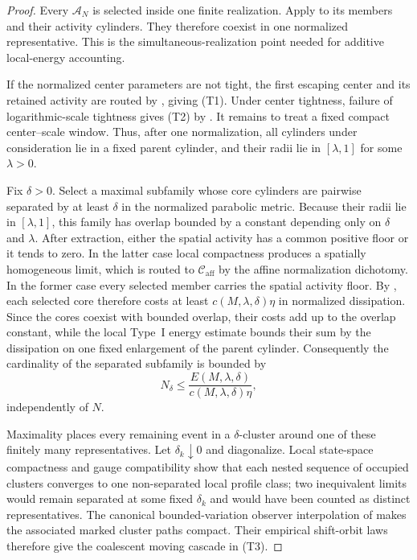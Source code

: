 \documentclass[11pt]{amsart}
\numberwithin{equation}{section}
\theoremstyle{plain}
\theoremstyle{definition}
\theoremstyle{remark}
\newcommand{\Caff}{\mathcal C_{\mathrm{aff}}}
\begin{document}
\begin{proof}
Every \(\mathcal A_N\) is selected inside one finite realization.  Apply
 to its members and their
activity cylinders.  They therefore coexist in one normalized representative.
This is the simultaneous-realization point needed for additive local-energy
accounting.

If the normalized center parameters are not tight, the first escaping center
and its retained activity are routed by
,
giving \textup{(T1)}.  Under center tightness, failure of logarithmic-scale
tightness gives \textup{(T2)} by
.
It remains to treat a fixed compact center--scale window.  Thus, after one
normalization, all cylinders under consideration lie in a fixed parent
cylinder, and their radii lie in \([\lambda,1]\) for some \(\lambda>0\).

Fix \(\delta>0\).  Select a maximal subfamily whose core cylinders are
pairwise separated by at least \(\delta\) in the normalized parabolic metric.
Because their radii lie in \([\lambda,1]\), this family has overlap bounded by
a constant depending only on \(\delta\) and \(\lambda\).  After extraction,
either the spatial activity has a common positive floor or it tends to zero.
In the latter case local compactness produces a spatially homogeneous limit,
which is routed to \(\Caff\) by the affine normalization dichotomy.  In the
former case every selected member carries the spatial activity floor.  By
, each selected core therefore costs
at least \(c(M,\lambda,\delta)\eta\) in normalized dissipation.  Since the
cores coexist with bounded overlap, their costs add up to the overlap
constant, while the local Type~I energy estimate
 bounds their sum by the
dissipation on one fixed enlargement of the parent cylinder.  Consequently
the cardinality of the separated subfamily is bounded by
\[
 N_{\delta}
 \le
 \frac{E(M,\lambda,\delta)}{c(M,\lambda,\delta)\eta},
\]
independently of \(N\).

Maximality places every remaining event in a \(\delta\)-cluster around one of
these finitely many representatives.  Let \(\delta_k\downarrow0\) and
diagonalize.  Local state-space compactness and gauge compatibility show that
each nested sequence of occupied clusters converges to one non-separated local
profile class; two inequivalent limits would remain separated at some fixed
\(\delta_k\) and would have been counted as distinct representatives.  The
canonical bounded-variation observer interpolation of
 makes the associated marked cluster
paths compact.  Their empirical shift-orbit laws therefore give the
coalescent moving cascade in \textup{(T3)}.


\end{proof}
\end{document}
